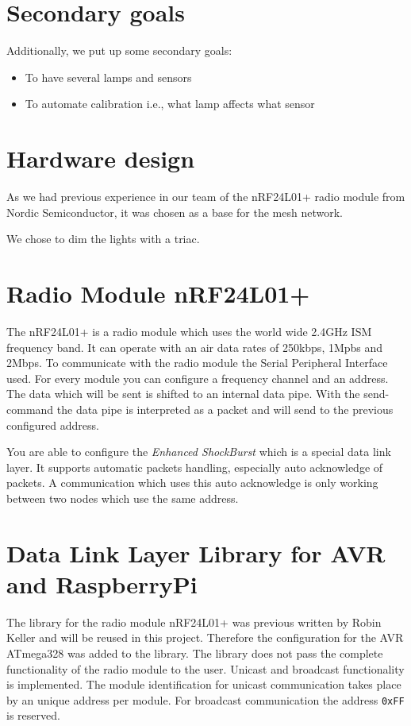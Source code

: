 \documentclass[11pt]{article}
\begin{document}
	\section{Secondary goals}
   Additionally, we put up some secondary goals:
	\begin{itemize}
		\item To have several lamps and sensors
		\item To automate calibration i.e., what lamp affects what sensor
	\end{itemize}

   \section{Hardware design}
   As we had previous experience in our team of the nRF24L01+ radio module from
   Nordic Semiconductor, it was chosen as a base for the mesh network.

   We chose to dim the lights with a triac.
   
   \section{Radio Module nRF24L01+}
   The nRF24L01+ is a radio module which uses the world wide 2.4GHz ISM frequency band. It can operate with an air data rates of 250kbps, 1Mpbs and 2Mbps. To communicate with the radio module the Serial Peripheral Interface used. For every module you can configure a frequency channel and an address. The data which will be sent is shifted to an internal data pipe. With the send-command the data pipe is interpreted as a packet and will send to the previous configured address.
   
   You are able to configure the \textit{Enhanced ShockBurst\texttrademark} which is a special data link layer. It supports automatic packets handling, especially auto acknowledge of packets.
   A communication which uses this auto acknowledge is only working between two nodes which use the same address.
   
   \section{Data Link Layer Library for AVR and RaspberryPi}
   The library for the radio module nRF24L01+ was previous written by Robin Keller and will be reused in this project. Therefore the configuration for the AVR ATmega328 was added to the library.
   The library does not pass the complete functionality of the radio module to the user. Unicast and broadcast functionality is implemented. The module identification for unicast communication takes place by an unique address per module. For broadcast communication the address \texttt{0xFF} is reserved.
   
\end{document}
